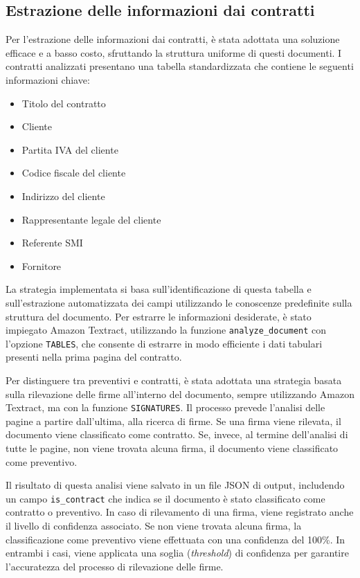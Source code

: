 \subsection{Estrazione delle informazioni dai contratti}
\label{subsec:estrazione-contratti}
Per l'estrazione delle informazioni dai contratti, è stata adottata una soluzione efficace e a basso costo, sfruttando la struttura uniforme di questi documenti. I contratti analizzati presentano una tabella standardizzata che contiene le seguenti informazioni chiave:

\begin{itemize}
    \item Titolo del contratto
    \item Cliente
    \item Partita IVA del cliente
    \item Codice fiscale del cliente
    \item Indirizzo del cliente
    \item Rappresentante legale del cliente
    \item Referente SMI
    \item Fornitore
\end{itemize}

La strategia implementata si basa sull'identificazione di questa tabella e sull'estrazione automatizzata dei campi utilizzando le conoscenze predefinite sulla struttura del documento. Per estrarre le informazioni desiderate, è stato impiegato Amazon Textract, utilizzando la funzione \texttt{analyze\_document} con l'opzione \texttt{TABLES}, che consente di estrarre in modo efficiente i dati tabulari presenti nella prima pagina del contratto.

Per distinguere tra preventivi e contratti, è stata adottata una strategia basata sulla rilevazione delle firme all'interno del documento, sempre utilizzando Amazon Textract, ma con la funzione \texttt{SIGNATURES}. Il processo prevede l'analisi delle pagine a partire dall'ultima, alla ricerca di firme. Se una firma viene rilevata, il documento viene classificato come contratto. Se, invece, al termine dell'analisi di tutte le pagine, non viene trovata alcuna firma, il documento viene classificato come preventivo.

Il risultato di questa analisi viene salvato in un file JSON di output, includendo un campo \texttt{is\_contract} che indica se il documento è stato classificato come contratto o preventivo. In caso di rilevamento di una firma, viene registrato anche il livello di confidenza associato. Se non viene trovata alcuna firma, la classificazione come preventivo viene effettuata con una confidenza del 100\%. In entrambi i casi, viene applicata una soglia (\textit{threshold}) di confidenza per garantire l'accuratezza del processo di rilevazione delle firme.

